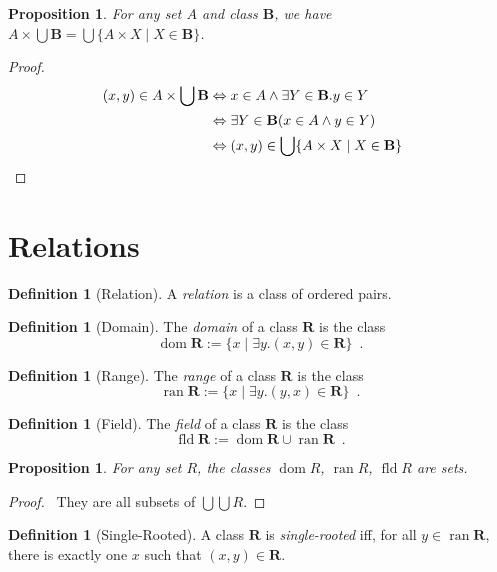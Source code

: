 \documentclass{book}
\let\qed\relax
\newtheorem{prop}[ax]{Proposition}
\theoremstyle{definition}
\newtheorem{df}[ax]{Definition}
\newcommand{\dom}{\ensuremath{\operatorname{dom}}}
\newcommand{\ran}{\ensuremath{\operatorname{ran}}}
\newcommand{\fld}{\ensuremath{\operatorname{fld}}}
\begin{document}
\begin{prop}
For any set $A$ and class $\mathbf{B}$, we have $A \times \bigcup \mathbf{B} = \bigcup \{A \times X \mid X \in \mathbf{B}\}$.
\end{prop}

\begin{proof}
\pf
\begin{align*}
(x,y) \in A \times \bigcup \mathbf{B} & \Leftrightarrow x \in A \wedge \exists Y \in \mathbf{B}. y \in Y \\
& \Leftrightarrow \exists Y \in \mathbf{B} (x \in A \wedge y \in Y) \\
& \Leftrightarrow (x,y) \in \bigcup \{A \times X \mid X \in \mathbf{B}\} & \qed
\end{align*}
\end{proof}

\section{Relations}

\begin{df}[Relation]
A \emph{relation} is a class of ordered pairs.
\end{df}

\begin{df}[Domain]
The \emph{domain} of a class $\mathbf{R}$ is the class
\[ \dom \mathbf{R} := \{ x \mid \exists y. (x,y) \in \mathbf{R} \} \enspace . \]
\end{df}

\begin{df}[Range]
The \emph{range} of a class $\mathbf{R}$ is the class
\[ \ran \mathbf{R} := \{ x \mid \exists y. (y,x) \in \mathbf{R} \} \enspace . \]
\end{df}

\begin{df}[Field]
The \emph{field} of a class $\mathbf{R}$ is the class
\[ \fld \mathbf{R} := \dom \mathbf{R} \cup \ran \mathbf{R} \enspace . \]
\end{df}

\begin{prop}
For any set $R$, the classes $\dom R$, $\ran R$, $\fld R$ are sets.
\end{prop}

\begin{proof}
\pf\ They are all subsets of $\bigcup \bigcup R$. \qed
\end{proof}

\begin{df}[Single-Rooted]
A class $\mathbf{R}$ is \emph{single-rooted} iff, for all $y \in \ran \mathbf{R}$, there is exactly one $x$ such that $(x,y) \in \mathbf{R}$.
\end{df}
\end{document}
